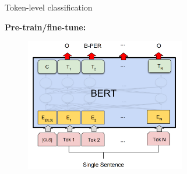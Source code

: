 \begin{vbframe}{Token-level classification}

\vfill

\textbf{Pre-train/fine-tune:}

	\begin{figure}
		\centering
		\includegraphics[width = 7cm]{figure/toklevel.png}\\ 
	\end{figure}

\vfill

\end{vbframe}


